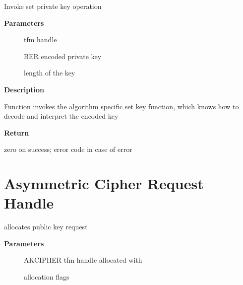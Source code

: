 \documentclass[a4paper,8pt,english]{sphinxmanual}
\begin{document}
\begin{fulllineitems}
\label{crypto/api-akcipher:c.crypto_akcipher_set_priv_key}
Invoke set private key operation

\end{fulllineitems}


\textbf{Parameters}
\begin{description}
\item[{}] \leavevmode
tfm handle

\item[{}] \leavevmode
BER encoded private key

\item[{}] \leavevmode
length of the key

\end{description}

\textbf{Description}

Function invokes the algorithm specific set key function, which knows
how to decode and interpret the encoded key

\textbf{Return}

zero on success; error code in case of error


\section{Asymmetric Cipher Request Handle}
\label{crypto/api-akcipher:asymmetric-cipher-request-handle}

\begin{fulllineitems}
\label{crypto/api-akcipher:c.akcipher_request_alloc}
allocates public key request

\end{fulllineitems}


\textbf{Parameters}
\begin{description}
\item[{}] \leavevmode
AKCIPHER tfm handle allocated with {\hyperref[crypto/api\string-akcipher:c.crypto_alloc_akcipher]{\emph{}}}

\item[{}] \leavevmode
allocation flags

\end{description}
\end{document}
